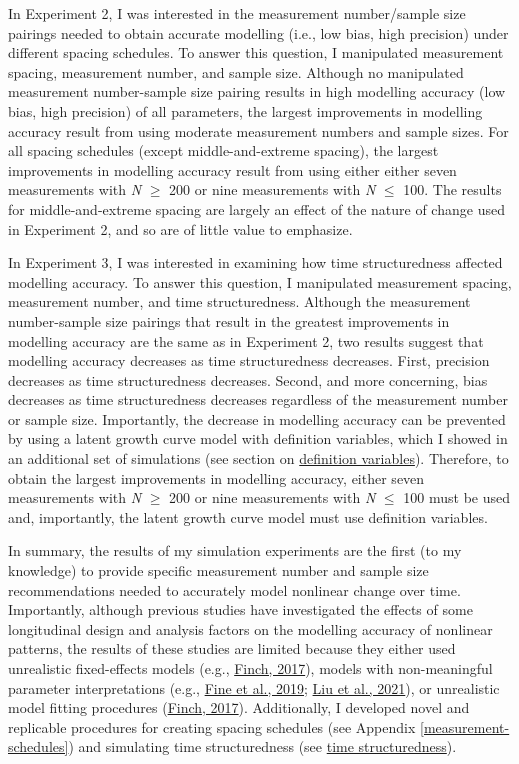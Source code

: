 \documentclass[
12pt, %
twoside,
english]{guelphthesis}
\begin{document}
In Experiment 2, I was interested in the measurement number/sample size pairings needed to obtain accurate modelling (i.e., low bias, high precision) under different spacing schedules. To answer this question, I manipulated measurement spacing, measurement number, and sample size. Although no manipulated measurement number-sample size pairing results in high modelling accuracy (low bias, high precision) of all parameters, the largest improvements in modelling accuracy result from using moderate measurement numbers and sample sizes. For all spacing schedules (except middle-and-extreme spacing), the largest improvements in modelling accuracy result from using either either seven measurements with \emph{N} \(\ge\) 200 or nine measurements with \emph{N} \(\le\) 100. The results for middle-and-extreme spacing are largely an effect of the nature of change used in Experiment 2, and so are of little value to emphasize.

In Experiment 3, I was interested in examining how time structuredness affected modelling accuracy. To answer this question, I manipulated measurement spacing, measurement number, and time structuredness. Although the measurement number-sample size pairings that result in the greatest improvements in modelling accuracy are the same as in Experiment 2, two results suggest that modelling accuracy decreases as time structuredness decreases. First, precision decreases as time structuredness decreases. Second, and more concerning, bias decreases as time structuredness decreases regardless of the measurement number or sample size. Importantly, the decrease in modelling accuracy can be prevented by using a latent growth curve model with definition variables, which I showed in an additional set of simulations (see section on \protect\hyperlink{def-variables}{definition variables}). Therefore, to obtain the largest improvements in modelling accuracy, either seven measurements with \emph{N} \(\ge\) 200 or nine measurements with \emph{N} \(\le\) 100 must be used and, importantly, the latent growth curve model must use definition variables.

In summary, the results of my simulation experiments are the first (to my knowledge) to provide specific measurement number and sample size recommendations needed to accurately model nonlinear change over time. Importantly, although previous studies have investigated the effects of some longitudinal design and analysis factors on the modelling accuracy of nonlinear patterns, the results of these studies are limited because they either used unrealistic fixed-effects models (e.g., \protect\hyperlink{ref-finch2017}{Finch, 2017}), models with non-meaningful parameter interpretations (e.g., \protect\hyperlink{ref-fine2019}{Fine et al., 2019}; \protect\hyperlink{ref-liu2022}{Liu et al., 2021}), or unrealistic model fitting procedures (\protect\hyperlink{ref-finch2017}{Finch, 2017}). Additionally, I developed novel and replicable procedures for creating spacing schedules (see Appendix \ref{measurement-schedules}) and simulating time structuredness (see \protect\hyperlink{simulating-time-struc}{time structuredness}).
\end{document}
